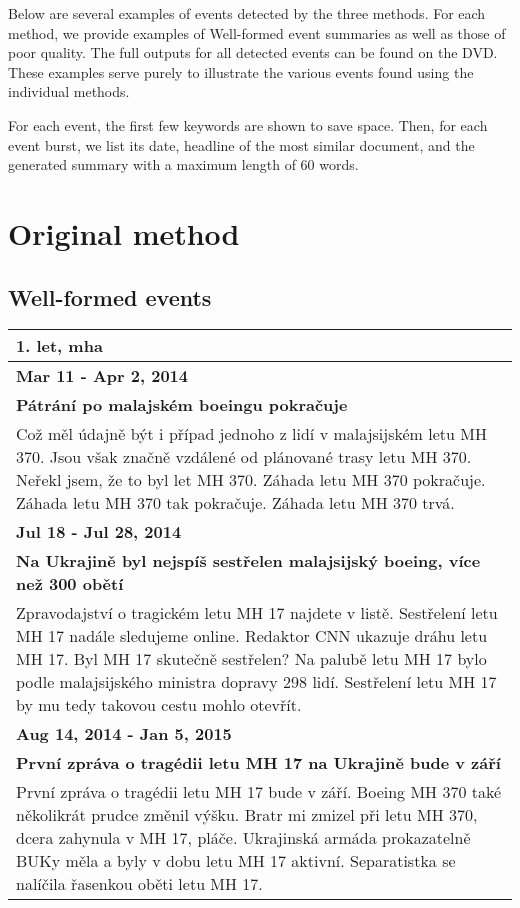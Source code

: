 Below are several examples of events detected by the three methods. For each method, we provide examples of Well-formed event summaries as well as those of poor quality. The full outputs for all detected events can be found on the DVD. These examples serve purely to illustrate the various events found using the individual methods.

For each event, the first few keywords are shown to save space. Then, for each event burst, we list its date, headline of the most similar document, and the generated summary with a maximum length of 60 words.

\section{Original method}
\subsection*{Well-formed events}
\begin{tabularx}{\linewidth}{p{\linewidth}} \toprule[1.5pt]

\bf 1. let, mha \\ \midrule
\bf Mar 11 - Apr 2, 2014 \\ \midrule
\bf Pátrání po malajském boeingu pokračuje \\
Což měl údajně být i případ jednoho z lidí v malajsijském letu MH 370. Jsou však značně vzdálené od plánované trasy letu MH 370. Neřekl jsem, že to byl let MH 370. Záhada letu MH 370 pokračuje. Záhada letu MH 370 tak pokračuje. Záhada letu MH 370 trvá. \\ \bottomrule[1.25pt]

\bf Jul 18 - Jul 28, 2014 \\ \midrule
\bf Na Ukrajině byl nejspíš sestřelen malajsijský boeing, více než 300 obětí \\
Zpravodajství o tragickém letu MH 17 najdete v listě. Sestřelení letu MH 17 nadále sledujeme online. Redaktor CNN ukazuje dráhu letu MH 17. Byl MH 17 skutečně sestřelen? Na palubě letu MH 17 bylo podle malajsijského ministra dopravy 298 lidí. Sestřelení letu MH 17 by mu tedy takovou cestu mohlo otevřít. \\ \bottomrule[1.25pt]

\bf Aug 14, 2014 - Jan 5, 2015 \\ \midrule
\bf První zpráva o tragédii letu MH 17 na Ukrajině bude v září \\
První zpráva o tragédii letu MH 17 bude v září. Boeing MH 370 také několikrát prudce změnil výšku. Bratr mi zmizel při letu MH 370, dcera zahynula v MH 17, pláče. Ukrajinská armáda prokazatelně BUKy měla a byly v dobu letu MH 17 aktivní. Separatistka se nalíčila řasenkou oběti letu MH 17. \\ \bottomrule[1.25pt]

\end{tabularx}

